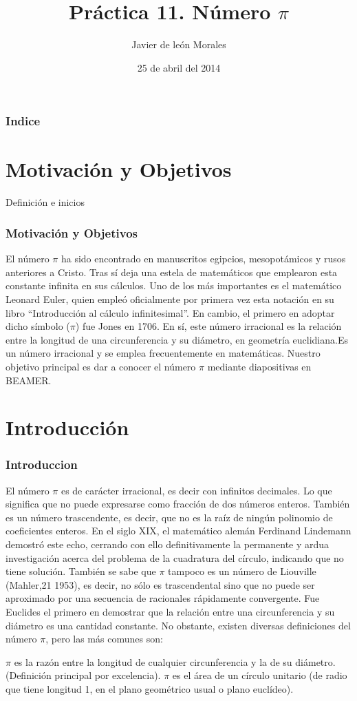 \documentclass{beamer}
\title[El número $\pi$]{Práctica 11. Número $\pi$}
\author[alu0100834024]{Javier de león Morales}
\institute{TE}
\date[25/04/2014]{25 de abril del 2014}
\begin{document}
\begin{frame}
\titlepage
\end{frame}

\begin{frame}
\frametitle{Indice}
\tableofcontents
\end{frame}

\section{Motivación y Objetivos}
\begin{frame}
\begin{block}{Definición e inicios}
\frametitle{Motivación y Objetivos}
El número $\pi$ ha sido encontrado en manuscritos egipcios, mesopotámicos y rusos anteriores a Cristo. Tras sí deja una estela de matemáticos que emplearon esta constante infinita en sus cálculos. Uno de los más importantes es el matemático Leonard Euler, quien empleó oficialmente por primera vez esta notación en su libro ``Introducción al cálculo infinitesimal''. En cambio, el primero en adoptar dicho símbolo ($\pi$) fue Jones en 1706.
%
En sí, este número irracional es la relación entre la longitud de una circunferencia y su diámetro, en geometría euclidiana.Es un número irracional y se emplea frecuentemente en matemáticas.
%
Nuestro objetivo principal es dar a conocer el número $\pi$ mediante diapositivas en BEAMER.
\end{block}
\end{frame}
%
\section{Introducción}
\begin{frame}
\frametitle{Introduccion}



El número $\pi$ es de carácter irracional, es decir con infinitos decimales. Lo que significa que no puede expresarse como fracción de dos números enteros. También es un número trascendente, es decir, que no es la raíz de ningún polinomio de coeficientes enteros. En el siglo XIX, el matemático alemán Ferdinand Lindemann demostró este echo, cerrando con ello definitivamente la permanente y ardua investigación acerca del problema de la cuadratura del círculo, indicando que no tiene solución.
También se sabe que $\pi$ tampoco es un número de Liouville (Mahler,21 1953), es decir, no sólo es trascendental sino que no puede ser aproximado por una secuencia de racionales rápidamente convergente.
%
Fue Euclides el primero en demostrar que la relación entre una circunferencia y su diámetro es una cantidad constante. No obstante, existen diversas definiciones del número $\pi$, pero las más comunes son:

$\pi$ es la razón entre la longitud de cualquier circunferencia y la de su diámetro. (Definición principal por excelencia).
$\pi$ es el área de un círculo unitario (de radio que tiene longitud 1, en el plano geométrico usual o plano euclídeo).

\end{frame}
\end{document}
